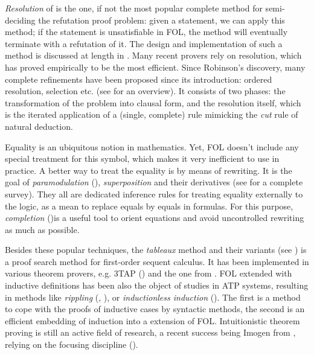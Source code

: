 \documentclass[twoside,a4paper,12pt]{article}
\begin{document}
\emph{Resolution} of \cite{robinson1965machine} is the one, if not the
most popular complete method for semi-deciding the refutation proof
problem: given a statement, we can apply this method; if the statement
is unsatisfiable in FOL, the method will eventually terminate with a
refutation of it. The design and implementation of such a method is
discussed at length in \cite{riazanov2002design}.  Many recent provers
rely on resolution, which has proved empirically to be the most
efficient. Since Robinson's discovery, many complete refinements have
been proposed since its introduction: ordered resolution,
selection etc. (see \cite{bachmair2001resolution} for an overview).
It consists of two phases: the transformation of the problem into
clausal form, and the resolution itself, which is the iterated
application of a (single, complete) rule mimicking the \emph{cut} rule
of natural deduction.

Equality is an ubiquitous notion in mathematics. Yet, FOL doesn't
include any special treatment for this symbol, which makes it very
inefficient to use in practice. A better way to treat the equality is
by means of rewriting. It is the goal of \emph{paramodulation}
(\cite{wos1968paramodulation}), \emph{superposition} and their
derivatives (see \cite{nieuwenhuis2001paramodulation} for a complete
survey).  They all are dedicated inference rules for treating equality
externally to the logic, as a mean to replace equals by equals in
formulas. For this purpose, \emph{completion}
(\cite{bachmair2001resolution})is a useful tool to orient equations
and avoid uncontrolled rewriting as much as possible.

Besides these popular techniques, the \emph{tableaux} method and their
variants (see \cite{hahnle2001tableaux}) is a proof search method for
first-order sequent calculus. It has been implemented in various
theorem provers, e.g. 3TAP (\cite{beckert1996tableau}) and the one
from \cite{paulson99}. FOL extended with inductive definitions has
been also the object of studies in ATP systems, resulting in methods
like \emph{rippling} (\cite{bundy1993rippling},
\cite{bundy2001automation}), or \emph{inductionless induction}
(\cite{comon2001inductionless}). The first is a method to cope with
the proofs of inductive cases by syntactic methods, the second is an
efficient embedding of induction into a extension of FOL.
Intuitionistic theorem proving is still an active field of research, a
recent success being \textsf{Imogen} from
\cite{mclaughlin2009efficient}, relying on the focusing discipline
(\cite{andreoli1992logic}).
\end{document}
